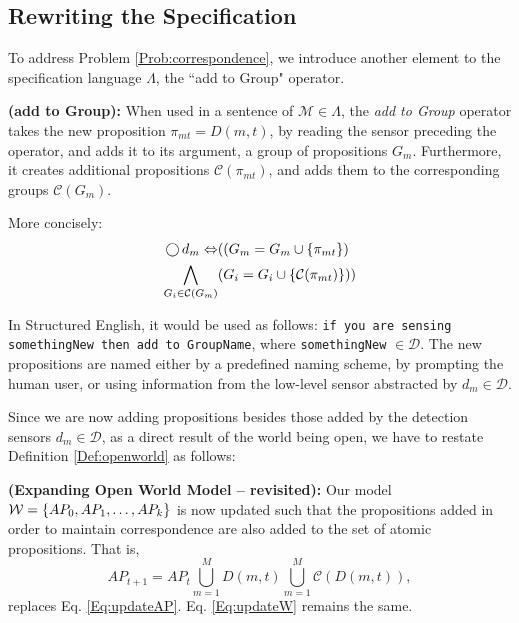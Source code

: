 \subsection{Rewriting the Specification} %

To address Problem \ref{Prob:correspondence}, we introduce another element to the specification language $\Lambda$, the ``add to Group" operator.

\begin{myDefinition}\label{Def:addto}
	\textbf{(add to Group):} When used in a sentence of $\mathcal{M} \in \Lambda$, the \emph{add to Group} operator takes the new proposition $\pi_{mt} = D(m,t)$, by reading the sensor preceding the operator, and adds it to its argument, a group of propositions $G_m$. 
	Furthermore, it creates additional propositions $\mathcal{C}(\pi_{mt})$, and adds them to the corresponding groups $\mathcal{C}(G_m)$. 
	
	More concisely:
	\begin{equation}
	\begin{split}
		\operatorname{\bigcirc} d_m \Leftrightarrow &((G_m = G_m \cup \left\{ \pi_{mt} \right\}) \\
		\bigwedge_{G_i \in \mathcal{C}(G_m)} &(G_i = G_i \cup \left\{ \mathcal{C}(\pi_{mt}) \right\}))
	\end{split}
	\end{equation}
\end{myDefinition}
In Structured English, it would be used as follows: \texttt{if you are sensing somethingNew then add to GroupName}, where \texttt{somethingNew} $\in \mathcal{D}$. The new propositions are named either by a predefined naming scheme, by prompting the human user, or using information from the low-level sensor abstracted by $d_m \in \mathcal{D}$.

Since we are now adding propositions besides those added by the detection sensors $d_m \in \mathcal{D}$, as a direct result of the world being open, we have to restate Definition \ref{Def:openworld} as follows:

\begin{myDefinition}\label{Def:openworld2}	
	\textbf{(Expanding Open World Model -- revisited):} Our model $\mathcal{W} = \left\{ AP_0, AP_1, \ldots, AP_k \right\}$ is now updated such that the propositions added in order to maintain correspondence are also added to the set of atomic propositions. That is, 
	\begin{equation}\label{Eq:updateAP2}
		AP_{t+1} = AP_t \bigcup_{m=1}^{M}D(m, t) \bigcup_{m=1}^{M}\mathcal{C}(D(m, t)),
	\end{equation}
	replaces Eq. \eqref{Eq:updateAP}. Eq. \eqref{Eq:updateW} remains the same.
\end{myDefinition}

